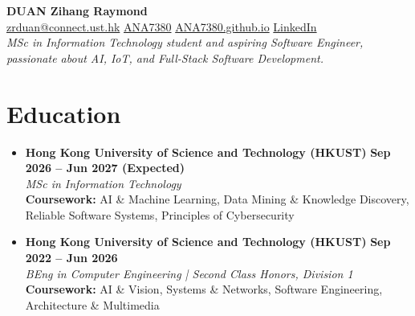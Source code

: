 \documentclass[a4paper,10pt]{article}
\begin{document}
\pagestyle{empty} %

\begin{center}
    {\LARGE \textbf{DUAN Zihang Raymond}} \\ \vspace{3pt}
    \small
    \faEnvelope \href{mailto:zrduan@connect.ust.hk}{ zrduan@connect.ust.hk} \quad
     \quad
    \faGithub \href{https://github.com/ANA7380}{ ANA7380} \quad
    \faGlobe \href{https://ANA7380.github.io}{ ANA7380.github.io} \quad
    \faLinkedin \href{https://www.linkedin.com/in/zihang-raymond-duan-3b51682b9/}{ LinkedIn} \\ \vspace{2pt}
    \textit{MSc in Information Technology student and aspiring Software Engineer, passionate about AI, IoT, and Full-Stack Software Development.}
\end{center}

\section{Education}
\begin{itemize}[leftmargin=*, label={}, itemsep=1pt]
    \item \textbf{Hong Kong University of Science and Technology (HKUST)} \hfill \textbf{Sep 2026 -- Jun 2027 (Expected)} \\
    \textit{MSc in Information Technology} \\
    \textbf{Coursework:} AI \& Machine Learning, Data Mining \& Knowledge Discovery, Reliable Software Systems, Principles of Cybersecurity

    \item \textbf{Hong Kong University of Science and Technology (HKUST)} \hfill \textbf{Sep 2022 -- Jun 2026} \\
    \textit{BEng in Computer Engineering | Second Class Honors, Division 1} \\
    \textbf{Coursework:} AI \& Vision, Systems \& Networks, Software Engineering, Architecture \& Multimedia
\end{itemize}

\end{document}

